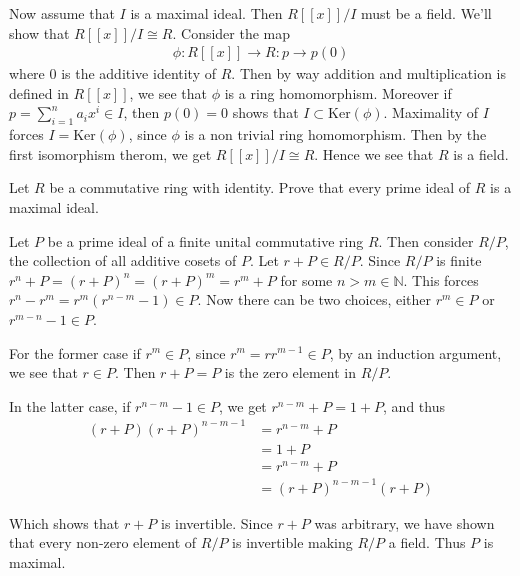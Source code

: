 \documentclass[12pt]{exam}
\theoremstyle{plain} %
\theoremstyle{definition} %
\theoremstyle{remark} %
\begin{document}
\begin{questions}
\begin{solution}
    Now assume that $I$ is a maximal ideal. Then $R[[x]]/I$ must be a
    field. We'll show that $R[[x]]/I \cong R$. Consider the map
    \begin{align*}
      \phi : R[[x]] \to R : p \to p(0)
    \end{align*}
    where $0$ is the additive identity of $R$. Then by way addition
    and multiplication is defined in $R[[x]]$, we see that $\phi$ is
    a ring homomorphism. Moreover if $p = \sum_{i = 1}^{n} a_i x^i
    \in I$, then $p(0) = 0$ shows that $I \subset
    \textrm{Ker}(\phi)$. Maximality of $I$ forces $I =
    \textrm{Ker}(\phi)$, since $\phi$ is a non trivial ring
    homomorphism. Then by the first isomorphism therom, we get
    $R[[x]]/I \cong R$. Hence we see that $R$ is a field.
  \end{solution}

  \question
  Let $R$ be a commutative ring with identity. Prove that every prime
  ideal of $R$ is a maximal ideal.
  \begin{solution}
    Let $P$ be a prime ideal of a finite unital commutative ring $R$.
    Then consider $R/P$, the collection of all additive cosets of
    $P$. Let $r + P \in R/P$. Since $R/P$ is finite $r^n + P = (r +
    P)^n = (r + P)^m =  r^m + P$ for some $n > m \in \mathbb{N}$.
    This forces $r^n - r^m = r^m(r^{n-m} - 1) \in P$. Now there can
    be two choices, either $r^m \in P$ or $r^{m-n} -1 \in P$.

    For the former case if $r^m \in P$, since $r^m = rr^{m-1} \in P$,
    by an induction argument, we see that $r \in P$. Then $r + P = P$
    is the zero element in $R/P$.

    In the latter case, if $r^{n-m} - 1 \in P$, we get $r^{n-m} + P =
    1 + P$, and thus
    \begin{align*}
      (r + P)(r + P)^{n - m - 1} &= r^{n - m} + P \\
      &= 1 + P \\
      &= r^{n - m} + P \\
      &= (r + P)^{n - m - 1}(r + P)
    \end{align*}
  \end{solution}
  Which shows that $r + P$ is invertible. Since $r + P$ was
  arbitrary, we have shown that every non-zero element of $R/P$ is
  invertible making $R/P$ a field. Thus $P$ is maximal.
\end{questions}
\printbibliography[heading=bibintoc]
\end{document}
